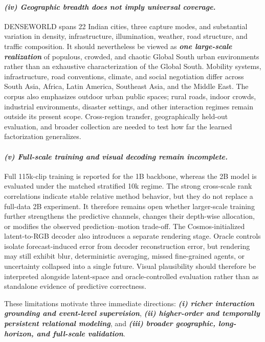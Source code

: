 \paragraph{\textbf{\emph{(iv) Geographic breadth does not imply universal coverage.}}} DENSEWORLD spans 22 Indian cities, three capture modes, and substantial variation in density, infrastructure, illumination, weather, road structure, and traffic composition. It should nevertheless be viewed as \textbf{\emph{one large-scale realization}} of populous, crowded, and chaotic Global South urban environments rather than an exhaustive characterization of the Global South. Mobility systems, infrastructure, road conventions, climate, and social negotiation differ across South Asia, Africa, Latin America, Southeast Asia, and the Middle East. The corpus also emphasizes outdoor urban public spaces; rural roads, indoor crowds, industrial environments, disaster settings, and other interaction regimes remain outside its present scope. Cross-region transfer, geographically held-out evaluation, and broader collection are needed to test how far the learned factorization generalizes.

\paragraph{\textbf{\emph{(v) Full-scale training and visual decoding remain incomplete.}}} Full 115k-clip training is reported for the 1B backbone, whereas the 2B model is evaluated under the matched stratified 10k regime. The strong cross-scale rank correlations indicate stable relative method behavior, but they do not replace a full-data 2B experiment. It therefore remains open whether larger-scale training further strengthens the predictive channels, changes their depth-wise allocation, or modifies the observed prediction--motion trade-off. The Cosmos-initialized latent-to-RGB decoder also introduces a separate rendering stage. Oracle controls isolate forecast-induced error from decoder reconstruction error, but rendering may still exhibit blur, deterministic averaging, missed fine-grained agents, or uncertainty collapsed into a single future. Visual plausibility should therefore be interpreted alongside latent-space and oracle-controlled evaluation rather than as standalone evidence of predictive correctness.

These limitations motivate three immediate directions: \textbf{\emph{(i) richer interaction grounding and event-level supervision}}, \textbf{\emph{(ii) higher-order and temporally persistent relational modeling}}, and \textbf{\emph{(iii) broader geographic, long-horizon, and full-scale validation}}.
